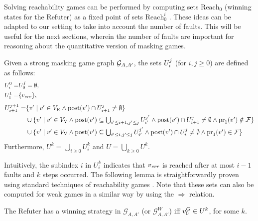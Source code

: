 	Solving reachability games can be performed by computing sets $\text{Reach}_0$ (winning states for the Refuter) as a fixed point of
sets $\text{Reach}^i_0$  \cite{Jurd11}.
	These ideas can be adapted to our setting to take into account the number of faults. This will be useful for the next sections, wherein the number of faults are important for reasoning about the quantitative version of masking games.
\begin{defi}\label{def:U} Given a strong masking game graph $\mathcal{G}_{A, A'}$, 
the sets $U^j_i$ (for $i,j \geq 0$) are defined as follows:
\begin{align*}
  U^0_i =& U^j_0 = \emptyset,  \label{def:of:Uji} \\
  U_1^1 =&  \{\ErrorSt\},
  \hspace{12.5cm} {}\notag
\end{align*}
\begin{align*}
  U_{i+1}^{j+1} =&
    \{v' \mid v' \in V_{\mathrm{R}} \wedge \operatorname{post}(v') \cap U_{i+1}^j \neq \emptyset\} \\
    &\textstyle\cup
    \{v' \mid v' \in V_{\mathrm{V}} \wedge \operatorname{post}(v') \subseteq \bigcup_{i'\leq i+1, j' \leq j}U_{i'}^{j'} \wedge \operatorname{post}(v') \cap U^j_{i+1} \neq \emptyset \wedge \operatorname{pr}_{1}(v') \notin \mathcal{F} \} \\
    &\textstyle \cup
    \{v' \mid  v' \in V_{\mathrm{V}} \wedge \operatorname{post}(v') \subseteq \bigcup_{i'\leq i, j' \leq j}U_{i'}^{j'} \wedge \operatorname{post}(v') \cap U^j_i \neq \emptyset \wedge \operatorname{pr}_{1}(v') \in \mathcal{F} \}
\end{align*}
Furthermore, $U^k = \bigcup_{i \geq 0} U_i^k$ and $U = \bigcup_{k \geq 0} U^k$.
\end{defi}
Intuitively, the subindex $i$ in $U^k_i$ indicates that $v_{\mathit{err}}$ is reached after at most $i-1$ faults and $k$ steps occurred.
The following lemma is straightforwardly proven using standard techniques of reachability games \cite{AlfaroHK07}.
	Note that these sets can also be computed  for weak games in a similar way by using the $\Rightarrow$ relation.
\begin{lem} \label{lemma:RefWinStrat} The Refuter has a winning strategy in $\mathcal{G}_{A, A'}$ (or $\mathcal{G}^W_{A, A'}$) iff $v_0^G \in U^k$, for some $k$.
\end{lem}
